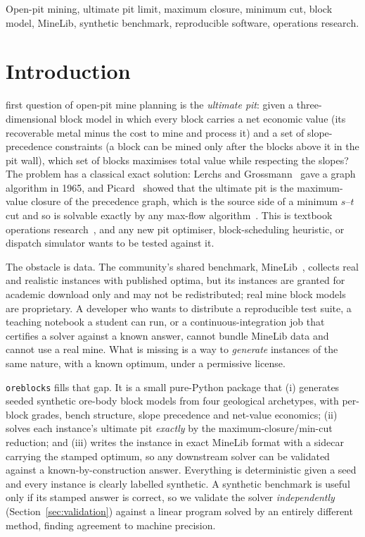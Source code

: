 \documentclass[journal]{IEEEtran}
\begin{document}
\begin{IEEEkeywords}
Open-pit mining, ultimate pit limit, maximum closure, minimum cut, block model, MineLib, synthetic benchmark,
reproducible software, operations research.
\end{IEEEkeywords}

\section{Introduction}

 first question of open-pit mine planning is the \emph{ultimate pit}: given a
three-dimensional block model in which every block carries a net economic value (its recoverable metal minus the
cost to mine and process it) and a set of slope-precedence constraints (a block can be mined only after the
blocks above it in the pit wall), which set of blocks maximises total value while respecting the slopes? The
problem has a classical exact solution: Lerchs and Grossmann~\cite{lg} gave a graph algorithm in 1965, and
Picard~\cite{picard} showed that the ultimate pit is the maximum-value closure of the precedence graph, which is
the source side of a minimum $s$--$t$ cut and so is solvable exactly by any max-flow
algorithm~\cite{fordfulkerson,dinitz,hochbaumchen,hochbaum}. This is textbook operations
research~\cite{newman}, and any new pit optimiser, block-scheduling heuristic, or dispatch simulator wants to be
tested against it.

The obstacle is data. The community's shared benchmark, MineLib~\cite{minelib}, collects real and realistic
instances with published optima, but its instances are granted for academic download only and may not be
redistributed; real mine block models are proprietary. A developer who wants to distribute a reproducible test suite, a
teaching notebook a student can run, or a continuous-integration job that certifies a solver against a known
answer, cannot bundle MineLib data and cannot use a real mine. What is missing is a way to \emph{generate}
instances of the same nature, with a known optimum, under a permissive license.

\texttt{oreblocks} fills that gap. It is a small pure-Python package that (i) generates seeded synthetic ore-body
block models from four geological archetypes, with per-block grades, bench structure, slope precedence and
net-value economics; (ii) solves each instance's ultimate pit \emph{exactly} by the maximum-closure/min-cut
reduction; and (iii) writes the instance in exact MineLib format with a sidecar carrying the stamped optimum, so
any downstream solver can be validated against a known-by-construction answer. Everything is deterministic given
a seed and every instance is clearly labelled synthetic. A synthetic benchmark is useful only if its stamped
answer is correct, so we validate the solver \emph{independently} (Section~\ref{sec:validation}) against a
linear program solved by an entirely different method, finding agreement to machine precision.
\end{document}

